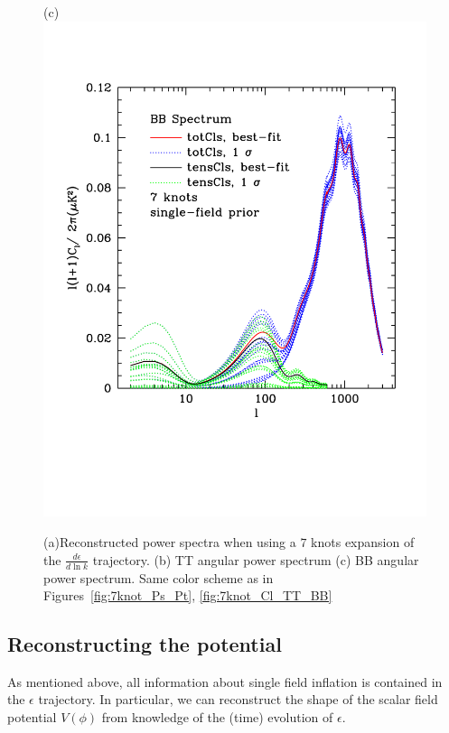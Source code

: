 \documentclass[a4paper,11pt]{article}
\begin{document}
\begin{figure}
\begin{minipage}{0.3\linewidth}
      (c)\includegraphics[width=0.9\linewidth]{p7eps_BB} 
    \end{minipage}
  \caption{(a)Reconstructed power spectra when using a $7$ knots
    expansion of the $\frac{d \epsilon}{d\ln k}$ trajectory. (b) TT
    angular power spectrum (c) BB angular power spectrum. Same color
    scheme as in Figures~\ref{fig:7knot_Ps_Pt}, \ref{fig:7knot_Cl_TT_BB}}
  \label{fig:p7eps}
\end{figure}


\subsection{Reconstructing the potential}

As mentioned above, all information about single field inflation is
contained in the $\epsilon$ trajectory. In particular, we can
reconstruct the shape of the scalar field potential $V(\phi)$ from
knowledge of the (time) evolution of $\epsilon$.
\end{document}
